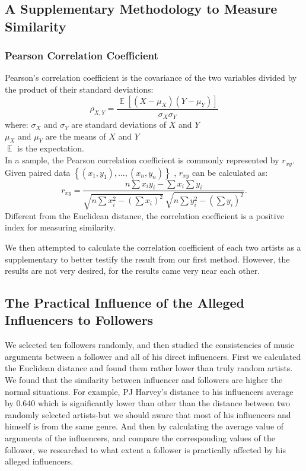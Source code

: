 \documentclass[12pt]{article}
\begin{document}
\subsection{A Supplementary Methodology to Measure Similarity}\quad \;
\subsubsection{Pearson Correlation Coefficient}
Pearson's correlation coefficient is the covariance of the two variables divided by the product of their standard deviations:\cite{3}
$${\displaystyle \rho _{X,Y}={\frac {\operatorname {\mathbb {E} } [(X-\mu _{X})(Y-\mu _{Y})]}{\sigma _{X}\sigma _{Y}}}}$$
where:
${\displaystyle {\sigma _{X}}}$ and ${\displaystyle {\sigma _{Y}}}$ are standard deviations of ${\displaystyle X}$ and ${\displaystyle Y}$\\
${\displaystyle \mu _{X}}$ and $\mu _{Y}$ are the means of ${\displaystyle X}$ and ${\displaystyle Y}$\\
${\displaystyle \operatorname {\mathbb {E} }}$ is the expectation.\\
In a sample, the Pearson correlation coefficient is commonly represented by ${\displaystyle r_{xy}}$. Given paired data ${\displaystyle \left\{(x_{1},y_{1}),\ldots ,(x_{n},y_{n})\right\}}$ , ${\displaystyle r_{xy}}$ can be calculated as:
$${\displaystyle r_{xy}={\frac {n\sum x_{i}y_{i}-\sum x_{i}\sum y_{i}}{{\sqrt {n\sum x_{i}^{2}-(\sum x_{i})^{2}}}~{\sqrt {n\sum y_{i}^{2}-(\sum y_{i})^{2}}}}}.}$$
Different from the Euclidean distance, the correlation coefficient is a positive index for measuring similarity.

We then attempted to calculate the correlation coefficient of each two artists as a supplementary to better testify the result from our first method. However, the results are not very desired, for the results came very near each other.


\subsection{The Practical Influence of the Alleged Influencers to Followers}\quad\;
We selected ten followers randomly, and then studied the consistencies of music arguments between a follower and all of his direct influencers. First we calculated the Euclidean distance and found them rather lower than truly random artists. We found that the similarity between influencer and followers are higher the normal situations. For example, PJ Harvey's distance to his influencers average by 0.640 which is significantly lower than other than the distance between two randomly selected artists-but we should aware that most of his influencers and himself is from the same genre. And then by calculating the average value of arguments of the influencers, and compare the corresponding values of the follower, we researched to what extent a follower is practically affected by his alleged influencers. 
\end{document}
